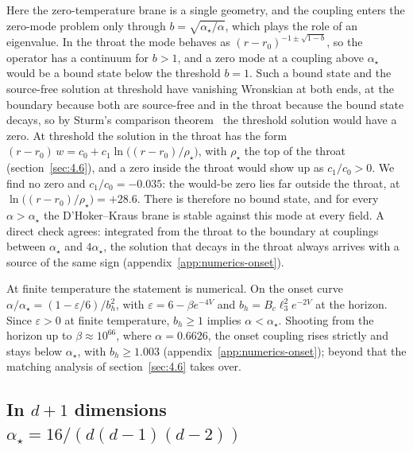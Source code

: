 Here the zero-temperature brane is a single geometry, and the coupling
enters the zero-mode problem only through $b = \sqrt{\alpha_\star/\alpha}$,
which plays the role of an eigenvalue. In the throat the mode behaves as
$(r - r_0)^{-1 \pm \sqrt{1 - b}}$, so the operator has a continuum for
$b > 1$, and a zero mode at a coupling above $\alpha_\star$ would be a
bound state below the threshold $b = 1$. Such a bound state and the
source-free solution at threshold have vanishing Wronskian at both ends,
at the boundary because both are source-free and in the throat because the
bound state decays, so by Sturm's comparison
theorem~\cite[theorem~9.39]{Teschl:2009mmqm} the threshold solution would
have a zero. At threshold the solution in the throat has the form
$(r - r_0)\,w = c_0 + c_1\ln\big((r - r_0)/\rho_\star\big)$, with
$\rho_\star$ the top of the throat (section~\ref{sec:4.6}), and a zero
inside the throat would show up as $c_1/c_0 > 0$. We find
no zero and $c_1/c_0 = -0.035$: the would-be zero lies far
outside the throat, at $\ln\big((r - r_0)/\rho_\star\big) = +28.6$. There is therefore
no bound state, and for every $\alpha > \alpha_\star$ the D'Hoker--Kraus
brane is stable against this mode at every field. A direct check agrees:
integrated from the throat to the boundary at couplings between
$\alpha_\star$ and $4\alpha_\star$, the solution that decays in the throat
always arrives with a source of the same sign
(appendix~\ref{app:numerics-onset}).

At finite temperature the statement is numerical. On the onset curve
$\alpha/\alpha_\star = (1 - \varepsilon/6)/b_h^2$, with
$\varepsilon = 6 - \beta e^{-4V}$ and $b_h = B_c\ell_3^2 e^{-2V}$ at the
horizon. Since $\varepsilon > 0$ at finite temperature, $b_h \ge 1$
implies $\alpha < \alpha_\star$. Shooting from the horizon up to
$\beta \approx 10^{66}$, where $\alpha = 0.6626$, the onset coupling rises
strictly and stays below $\alpha_\star$, with $b_h \ge 1.003$
(appendix~\ref{app:numerics-onset}); beyond that the matching analysis of
section~\ref{sec:4.6} takes over.

\subsection{In \texorpdfstring{$d+1$}{d+1} dimensions \texorpdfstring{$\alpha_\star = 16/(d(d-1)(d-2))$}{alpha* = 16/(d(d-1)(d-2))}}
\label{sec:4.3}

